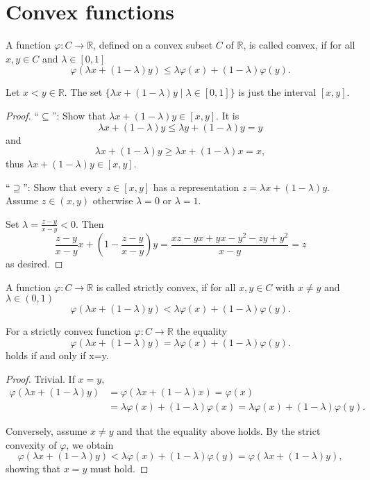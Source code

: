 \section{Convex functions}

\begin{definition}
  A function $\varphi: C \to \mathbb{R}$, defined on a convex subset $C$ of $\mathbb{R}$, is called convex, if for all $x,y \in C$ and $\lambda \in [0,1]$
  \[
  \varphi (\lambda x + (1-\lambda)y) \leq \lambda \varphi(x) + (1-\lambda) \varphi(y).
  \]
\end{definition}

\begin{proposition}
Let $x < y \in \mathbb{R}$. The set $\{\lambda x + (1-\lambda)y \mid \lambda \in [0,1]\}$ is just the interval $[x,y]$. 
\end{proposition}

\begin{proof}
  ``$\subseteq$'': Show that $\lambda x + (1-\lambda)y \in [x,y]$. It is
  \[
  \lambda x + (1-\lambda)y \leq \lambda y + (1-\lambda)y = y
  \] 
  and
  \[
  \lambda x + (1-\lambda)y \geq \lambda x + (1-\lambda) x = x,
  \]
  thus $\lambda x + (1-\lambda)y \in [x,y]$.
  
  ``$\supseteq$'': Show that every $z \in [x,y]$ has a representation $z=\lambda x + (1-\lambda)y$. Assume $z \in (x,y)$ otherwise $\lambda=0$ or $\lambda=1$.

  Set $\lambda=\frac{z-y}{x-y} < 0$. Then
  \[
  \frac{z-y}{x-y} x + (1- \frac{z-y}{x-y}) y = \frac{xz-yx+yx-y^2-zy+y^2}{x-y} = z
  \]
  as desired.
  
\end{proof}


\begin{definition}
  A function $\varphi: C \to \mathbb{R}$ is called strictly convex, if for all $x,y \in C$ with $x \neq y$ and $\lambda \in (0,1)$
  \[
  \varphi (\lambda x + (1-\lambda)y) < \lambda \varphi(x) + (1-\lambda) \varphi(y).
  \]
\end{definition}

\begin{proposition}\label{convex_eq}
  For a strictly convex function $\varphi: C \to \mathbb{R}$ the equality
  \[
  \varphi (\lambda x + (1-\lambda)y) = \lambda \varphi(x) + (1-\lambda) \varphi(y).
  \]
  holds if and only if x=y.
  
\end{proposition}

\begin{proof}
  Trivial. If $x=y$,
  \begin{align*}
    \varphi (\lambda x + (1-\lambda)y) &= \varphi (\lambda x + (1-\lambda)x) = \varphi(x)
    \\ &= \lambda \varphi(x) + (1-\lambda) \varphi(x) =\lambda \varphi(x) + (1-\lambda) \varphi(y).
  \end{align*}

  Conversely, assume $x \neq y$ and that the equality above holds. By the strict convexity of $\varphi$, we obtain
  \[
  \varphi (\lambda x + (1-\lambda)y) < \lambda \varphi(x) + (1-\lambda) \varphi(y) = \varphi(\lambda x + (1-\lambda)y),
  \]
  showing that $x=y$ must hold.
\end{proof}
